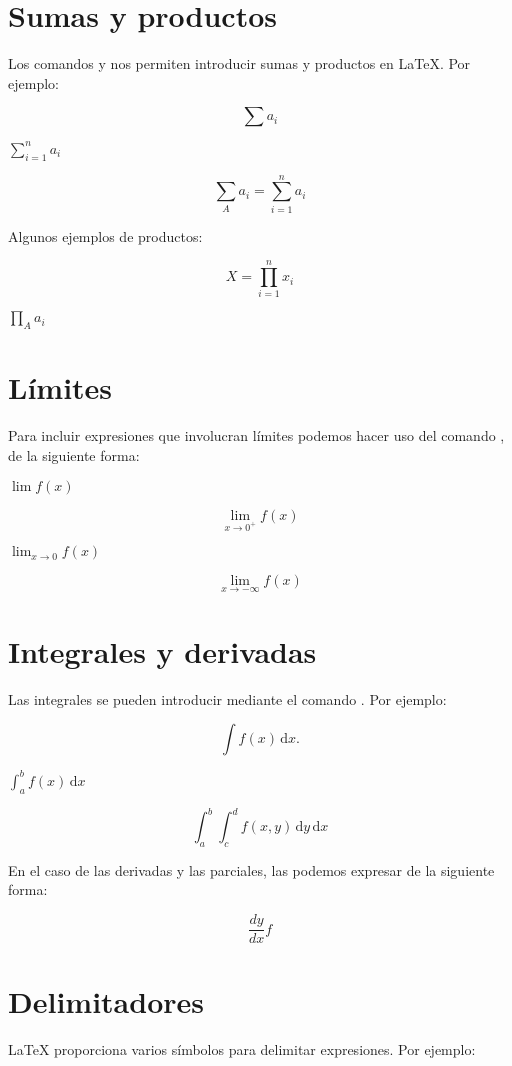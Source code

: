 \documentclass[letterpaper,12pt]{article}
\begin{document}
\section{Sumas y productos}

Los comandos \verb@\sum@ y \verb@prod@ nos permiten introducir sumas y productos en \LaTeX{}. Por ejemplo:

$$\sum a_i$$

$\displaystyle \sum_{i=1}^n a_i$

$$\sum_{A} a_i = \sum_{i=1}^n a_i $$

Algunos ejemplos de productos:

$$X= \prod_{i=1}^n x_i$$

$\displaystyle \prod_{A} a_i$

\section{Límites}

Para incluir expresiones que involucran límites podemos hacer uso del comando \verb@\lim@, de la siguiente forma:

$\displaystyle \lim f(x)$

\[ \lim_{x \rightarrow 0^{+}} f(x) \]

$\displaystyle \lim_{x\to 0} f(x) $

\[ \lim_{x \to -\infty} f(x) \]

\section{Integrales y derivadas}

Las integrales se pueden introducir mediante el comando \verb@\int@. Por ejemplo:

$$\int \! f(x) \, \mathrm{d}x. $$

$\displaystyle \int_a^b f(x) \, \mathrm{d}x $

\[ \int_a^b \int_c^d {f(x,y) \, \mathrm{d}y} \, \mathrm{d}x \]

En el caso de las derivadas y las parciales, las podemos expresar de la siguiente forma:

$$\frac{dy}{dx} f$$

\section{Delimitadores}

\LaTeX{} proporciona varios símbolos para delimitar expresiones. Por ejemplo:
\end{document}

